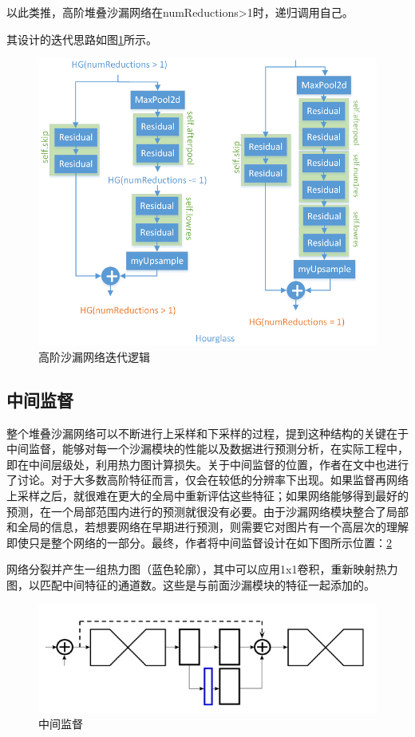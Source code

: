 以此类推，高阶堆叠沙漏网络在numReductions>1时，递归调用自己。

其设计的迭代思路如图\ref{8_k_hourglass}所示。

\begin{figure}[h]
	\includegraphics[width=\textwidth]{pic/8_k_hourglass.png}
	\caption{高阶沙漏网络迭代逻辑}
	\label{8_k_hourglass}
\end{figure}

\subsection{中间监督}

整个堆叠沙漏网络可以不断进行上采样和下采样的过程，提到这种结构的关键在于中间监督，能够对每一个沙漏模块的性能以及数据进行预测分析，在实际工程中，即在中间层级处，利用热力图计算损失。关于中间监督的位置，作者在文中也进行了讨论。对于大多数高阶特征而言，仅会在较低的分辨率下出现。如果监督再网络上采样之后，就很难在更大的全局中重新评估这些特征；如果网络能够得到最好的预测，在一个局部范围内进行的预测就很没有必要。由于沙漏网络模块整合了局部和全局的信息，若想要网络在早期进行预测，则需要它对图片有一个高层次的理解即使只是整个网络的一部分。最终，作者将中间监督设计在如下图所示位置：\ref{intermediate_supervision}

网络分裂并产生一组热力图（蓝色轮廓），其中可以应用1x1卷积，重新映射热力图，以匹配中间特征的通道数。这些是与前面沙漏模块的特征一起添加的。

\begin{figure}[h]
	\includegraphics[width=\textwidth]{pic/intermediate_supervision.jpg}
	\caption{中间监督}
	\label{intermediate_supervision}
\end{figure}

